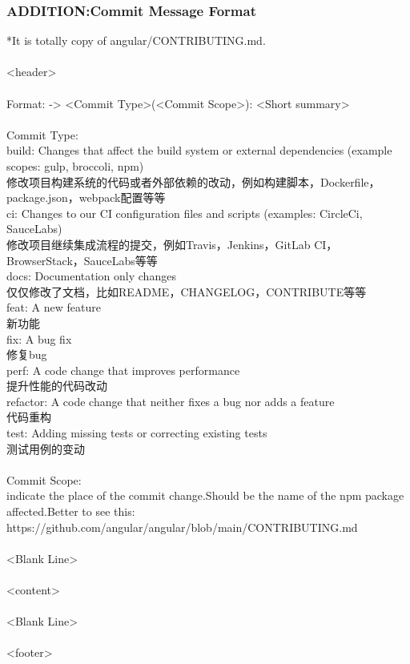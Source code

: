 \documentclass{article}
\begin{document}
\subsubsection{ADDITION:Commit Message Format}
*It is totally copy of angular/CONTRIBUTING.md.\\
\\
<header>\\
\\
Format: -> <Commit Type>(<Commit Scope>): <Short summary>\\
\\
Commit Type:\\
build: Changes that affect the build system or external dependencies (example scopes: gulp, broccoli, npm)\\
修改项目构建系统的代码或者外部依赖的改动，例如构建脚本，Dockerfile，package.json，webpack配置等等\\
ci: Changes to our CI configuration files and scripts (examples: CircleCi, SauceLabs)\\
修改项目继续集成流程的提交，例如Travis，Jenkins，GitLab CI，BrowserStack，SauceLabs等等\\
docs: Documentation only changes\\
仅仅修改了文档，比如README，CHANGELOG，CONTRIBUTE等等\\
feat: A new feature\\
新功能\\
fix: A bug fix\\
修复bug\\
perf: A code change that improves performance\\
提升性能的代码改动\\
refactor: A code change that neither fixes a bug nor adds a feature\\
代码重构\\
test: Adding missing tests or correcting existing tests\\
测试用例的变动\\
\\
Commit Scope:\\
indicate the place of the commit change.Should be the name of the npm package affected.Better to see this:\\
https://github.com/angular/angular/blob/main/CONTRIBUTING.md\\
\\
<Blank Line>\\
\\
<content>\\
\\
<Blank Line>\\
\\
<footer>\\
\end{document}
